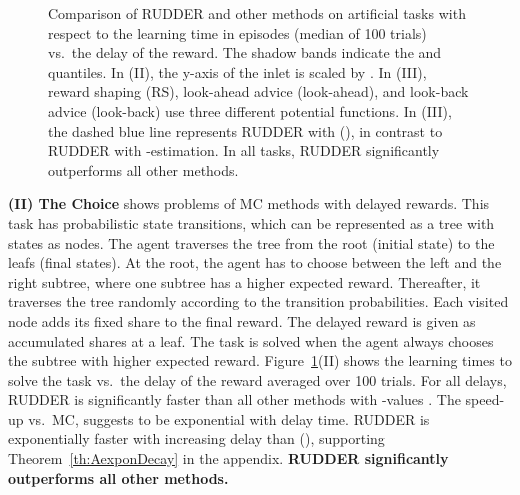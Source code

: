\documentclass{article}
\newcommand{\figpath}{figures/}
\begin{document}
\begin{figure}[!t]\centering \resizebox{\linewidth}{!}{}
\caption{Comparison of RUDDER and other methods on artificial tasks 
with respect to the learning time in episodes (median of 100 trials)
vs.\ the delay of the reward.
The shadow bands indicate the  and  quantiles.
In (II), the y-axis of the inlet is scaled by .
In (III), reward shaping (RS), 
look-ahead advice (look-ahead), 
and look-back advice (look-back) use three different potential functions.
In (III), the dashed blue line
represents RUDDER with (), 
in contrast to RUDDER with -estimation. 
In all tasks, RUDDER significantly outperforms all other methods.\label{fig:test}}\end{figure}

{\bf (II) The Choice}
shows problems of MC methods with delayed rewards.
This task has probabilistic state transitions, which
can be represented as a tree with states as nodes.
The agent traverses the tree from the root (initial state) 
to the leafs (final states).
At the root, the agent has to choose between 
the left and the right subtree,
where one subtree has a higher expected reward.
Thereafter, it traverses the tree randomly 
according to the transition probabilities. 
Each visited node adds its fixed share to the final reward. 
The delayed reward is given as accumulated shares at a leaf.
The task is solved when 
the agent always chooses the subtree with higher expected reward.
Figure~\ref{fig:test}(II) shows the 
learning times 
to solve the task vs.\ the delay of the reward averaged over 100 trials.
For all delays, RUDDER is significantly faster than all other methods
with -values .
The speed-up vs.\ MC, 
suggests to be exponential with delay time.
RUDDER is exponentially faster with increasing delay 
than (), 
supporting Theorem~\ref{th:AexponDecay} in the appendix. 
{\bf RUDDER significantly outperforms all other methods.}
\end{document}
